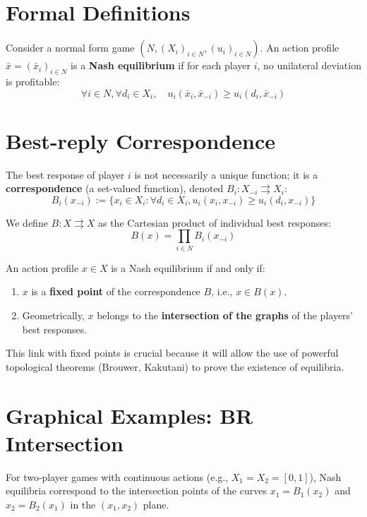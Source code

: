 \section{Formal Definitions}

\begin{definition}
Consider a normal form game $(N, (X_i)_{i \in N}, (u_i)_{i \in N})$. An action profile $\bar{x} = (\bar{x}_i)_{i \in N}$ is a \textbf{Nash equilibrium} if for each player $i$, no unilateral deviation is profitable:
\[ \forall i \in N, \forall d_i \in X_i, \quad u_i(\bar{x}_i, \bar{x}_{-i}) \ge u_i(d_i, \bar{x}_{-i}) \]
\end{definition}

\section{Best-reply Correspondence}

\begin{definition}
The best response of player $i$ is not necessarily a unique function; it is a \textbf{correspondence} (a set-valued function), denoted $B_i : X_{-i} \rightrightarrows X_i$:
$$B_i(x_{-i}) := \{ x_i \in X_i : \forall d_i \in X_i, u_i(x_i, x_{-i}) \ge u_i(d_i, x_{-i}) \}$$
\end{definition}

\begin{definition}
We define $B : X \rightrightarrows X$ as the Cartesian product of individual best responses:
$$B(x) = \prod_{i \in N} B_i(x_{-i})$$
\end{definition}

\begin{theoreme}
An action profile $x \in X$ is a Nash equilibrium if and only if:
\begin{enumerate}
    \item $x$ is a \textbf{fixed point} of the correspondence $B$, i.e., $x \in B(x)$.
    \item Geometrically, $x$ belongs to the \textbf{intersection of the graphs} of the players' best responses.
\end{enumerate}
\end{theoreme}
This link with fixed points is crucial because it will allow the use of powerful topological theorems (Brouwer, Kakutani) to prove the existence of equilibria.

\section{Graphical Examples: BR Intersection}
For two-player games with continuous actions (e.g., $X_1 = X_2 = [0,1]$), Nash equilibria correspond to the intersection points of the curves $x_1 = B_1(x_2)$ and $x_2 = B_2(x_1)$ in the $(x_1, x_2)$ plane.


